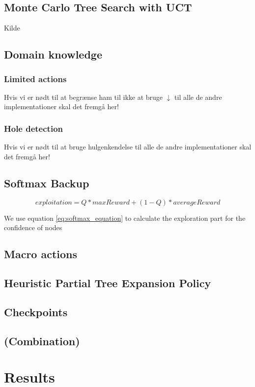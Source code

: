 \documentclass[10pt,a4paper]{article}
\begin{document}
\subsection{Monte Carlo Tree Search with UCT}
Kilde \cite{mctssurvey}

\subsection{Domain knowledge}

\subsubsection{Limited actions}
Hvis vi er nødt til at begrænse ham til ikke at bruge $\downarrow$ til alle de andre implementationer skal det fremgå her!
\subsubsection{Hole detection}
Hvis vi er nødt til at bruge hulgenkendelse til alle de andre implementationer skal det fremgå her!

\subsection{Softmax Backup}
\begin{equation}\label{eq:softmax_equation}
exploitation = Q * maxReward + (1 - Q ) * averageReward
\end{equation}

We use equation \ref{eq:softmax_equation} to calculate the exploration part for the confidence of nodes
\subsection{Macro actions}
\cite{salesman}
\subsection{Heuristic Partial Tree Expansion Policy}
\subsection{Checkpoints}

\subsection{(Combination)}

\section{Results}
\renewcommand{\arraystretch}{1.5}
\end{document}
